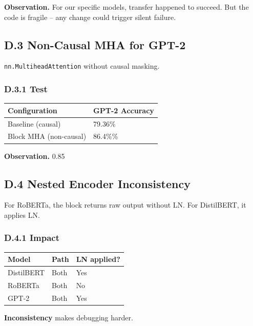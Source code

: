 \textbf{Observation.} For our specific models, transfer happened to succeed. But 
the code is fragile -- any change could trigger silent failure.

\subsection{D.3 Non-Causal MHA for GPT-2}

\texttt{nn.MultiheadAttention} without causal masking.

\subsubsection{D.3.1 Test}

\begin{table}[H]
\centering
\small
\begin{tabular}{ll}
\toprule
\textbf{Configuration} & \textbf{GPT-2 Accuracy} \\
\midrule
Baseline (causal) & 79.36\% \\
Block MHA (non-causal) & 86.4\%\% \\
\bottomrule
\end{tabular}
\end{table}

\textbf{Observation.} 0.85

\subsection{D.4 Nested Encoder Inconsistency}

For RoBERTa, the block returns raw output without LN. For DistilBERT, it 
applies LN.

\subsubsection{D.4.1 Impact}

\begin{table}[H]
\centering
\small
\begin{tabular}{lll}
\toprule
\textbf{Model} & \textbf{Path} & \textbf{LN applied?} \\
\midrule
DistilBERT & Both & Yes \\
RoBERTa & Both & No \\
GPT-2 & Both & Yes \\
\bottomrule
\end{tabular}
\end{table}

\textbf{Inconsistency} makes debugging harder.

